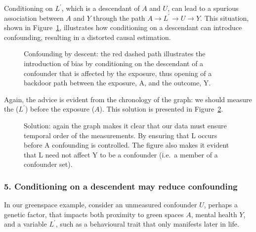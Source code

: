 \documentclass[
  singlecolumn]{article}
\begin{document}
Conditioning on \(L^\prime\), which is a descendant of \(A\) and \(U\),
can lead to a spurious association between \(A\) and \(Y\) through the
path \(A \to L^\prime \to U \to Y\). This situation, shown in
Figure~\ref{fig-dag-descendent}, illustrates how conditioning on a
descendant can introduce confounding, resulting in a distorted causal
estimation.

\begin{figure}[htb]


\caption{\label{fig-dag-descendent}Confounding by descent: the red
dashed path illustrates the introduction of bias by conditioning on the
descendant of a confounder that is affected by the exposure, thus
opening of a backdoor path between the exposure, A, and the outcome, Y.}

\end{figure}%

Again, the advice is evident from the chronology of the graph: we should
measure the (\(L^\prime\)) before the exposure (\(A\)). This solution is
presented in Figure~\ref{fig-dag-descendent-solution}.

\begin{figure}[htb]


\caption{\label{fig-dag-descendent-solution}Solution: again the graph
makes it clear that our data must ensure temporal order of the
measurements. By ensuring that L occurs before A confounding is
controlled. The figure also makes it evident that L need not affect Y to
be a confounder (i.e.~a member of a confounder set).}

\end{figure}%

\subsubsection{5. Conditioning on a descendent may reduce
confounding}\label{conditioning-on-a-descendent-may-reduce-confounding}

In our greenspace example, consider an unmeasured confounder \(U\),
perhaps a genetic factor, that impacts both proximity to green spaces
\(A\), mental health \(Y\), and a variable \(L^\prime\), such as a
behavioural trait that only manifests later in life.
\end{document}
